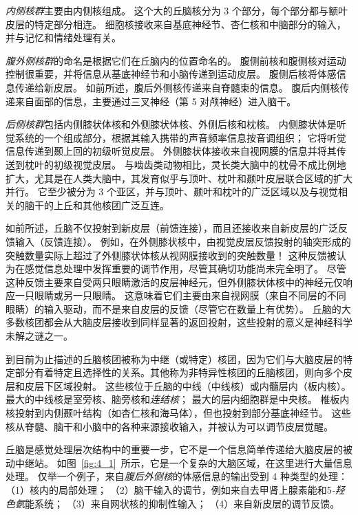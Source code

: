 \textit{内侧核群}主要由内侧核组成。
这个大的丘脑核分为 3 个部分，每个部分都与额叶皮层的特定部分相连。
细胞核接收来自基底神经节、杏仁核和中脑部分的输入，并与记忆和情绪处理有关。


\textit{腹外侧核群}的命名是根据它们在丘脑内的位置命名的。
腹侧前核和腹侧核对运动控制很重要，并将信息从基底神经节和小脑传递到运动皮层。
腹侧后核将体感信息传递给新皮层。
如前所述，腹后外侧核传递来自脊髓束的信息。
腹后内侧核传递来自面部的信息，主要通过三叉神经（第 5 对颅神经）进入脑干。


\textit{后侧核群}包括内侧膝状体核和外侧膝状体核、外侧后核和枕核。
内侧膝状体是听觉系统的一个组成部分，根据其输入携带的声音频率信息按音调组织；
它将听觉信息传递到颞上回的初级听觉皮层。
外侧膝状体接收来自视网膜的信息并将其传送到枕叶的初级视觉皮层。
与啮齿类动物相比，灵长类大脑中的枕骨不成比例地扩大，尤其是在人类大脑中，其发育似乎与顶叶、枕叶和颞叶皮层联合区域的扩大并行。
它至少被分为 3 个亚区，并与顶叶、颞叶和枕叶的广泛区域以及与视觉相关的脑干的上丘和其他核团广泛互连。


如前所述，丘脑不仅投射到新皮层（前馈连接），而且还接收来自新皮层的广泛反馈输入（反馈连接）。 
例如，在外侧膝状核中，由视觉皮层反馈投射的轴突形成的突触数量实际上超过了外侧膝状体核从视网膜接收到的突触数量！ 
这种反馈被认为在感觉信息处理中发挥重要的调节作用，尽管其确切功能尚未完全明了。
尽管这种反馈主要来自受两只眼睛激活的皮层神经元，但外侧膝状体核中的神经元仅响应一只眼睛或另一只眼睛。 
这意味着它们主要由来自视网膜（来自不同层的不同眼睛）的输入驱动，而不是来自皮层的反馈（尽管它在数量上有优势）。
丘脑的大多数核团都会从大脑皮层接收到同样显著的返回投射，这些投射的意义是神经科学未解之谜之一。


到目前为止描述的丘脑核团被称为中继（或特定）核团，因为它们与大脑皮层的特定部分有着特定且选择性的关系。其他称为非特异性核团的丘脑核团，则向多个皮层和皮层下区域投射。
这些核位于丘脑的中线（中线核）或内髓层内（板内核）。 
最大的中线核是室旁核、脑旁核和\textit{连结核}；
最大的层内细胞群是中央核。 
椎板内核投射到内侧颞叶结构（如杏仁核和海马体），但也投射到部分基底神经节。
这些核从脊髓、脑干和小脑中的各种来源接收输入，并被认为可以调节皮层觉醒。


丘脑是感觉处理层次结构中的重要一步，它不是一个信息简单传递给大脑皮层的被动中继站。 
如图~\ref{fig:4_1}~所示，它是一个复杂的大脑区域，在这里进行大量信息处理。 
仅举一个例子，来自\textit{腹后外侧核}的体感信息的输出受到 4 种类型的处理：
（1）核内的局部处理；
（2）脑干输入的调节，例如来自去甲肾上腺素能和5\textit{-羟色氨}能系统；
（3）来自网状核的抑制性输入； 
（4）来自新皮层的调节反馈。


